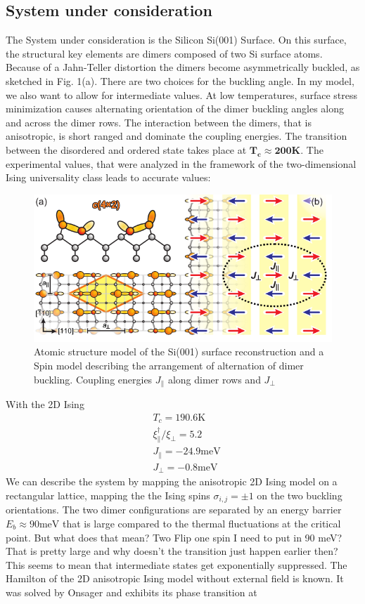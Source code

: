 	\subsection{System under consideration}
	The System under consideration is the Silicon Si(001) Surface. On this surface, the structural key elements are dimers composed of two Si surface atoms. Because of a Jahn-Teller distortion the dimers become asymmetrically buckled, as sketched in Fig. 1(a). There are two choices for the buckling angle. In my model, we also want to allow for intermediate values. At low temperatures, surface stress minimization causes alternating orientation of the dimer buckling angles along and across the dimer rows. The interaction between the dimers, that is anisotropic, is short ranged and dominate the coupling energies. The transition between the disordered and ordered state takes place at $\boldsymbol{T_c \approx 200K}$. The experimental values, that were analyzed in the framework of the two-dimensional Ising universality class leads to accurate values:
	\begin{figure}
		\centering
		\includegraphics[width=13cm]{graphics/Silicon-System.png}
		\caption{Atomic structure model of the Si(001) surface reconstruction and a Spin model describing the arrangement of alternation of dimer buckling. Coupling energies $J_{\parallel}$ along dimer rows and $J_{\perp}$ \cite{brand2023dimer}}
	\end{figure}
	With the 2D Ising
	\begin{align}
		&T_c =	190.6 \text{K}  \\
		&\xi_{\parallel}^{\dagger}/\xi_{\perp} =	5.2 		\\
		&J_{\parallel} =	-24.9 \text{meV} \\
		&J_{\perp} = -0.8 \text{meV}
	\end{align}
	We can describe the system by mapping the anisotropic 2D Ising model on a rectangular lattice, mapping the the Ising spins $\sigma_{i,j} =	\pm 1$ on the two buckling orientations. The two dimer configurations are separated by an energy barrier $E_b \approx 90 \text{meV}$ that is large compared to the thermal fluctuations at the critical point. But what does that mean? Two Flip one spin I need to put in 90 meV? That is pretty large and why doesn't the transition just happen earlier then? This seems to mean that intermediate states get exponentially suppressed. The Hamilton of the 2D anisotropic Ising model without external field is known. It was solved by Onsager and exhibits its phase transition at
